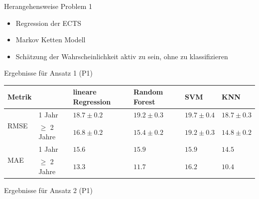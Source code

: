 \documentclass[17pt, fleqn]{beamer}
\begin{document}
\begin{frame}{Herangehensweise Problem 1}
    \begin{itemize}
        \item Regression der ECTS \\[1cm]
        \pause
        \item Markov Ketten Modell \\[1cm]
        \pause
        \item Schätzung der Wahrscheinlichkeit aktiv zu sein, ohne zu klassifizieren
    \end{itemize}
    
\end{frame}

\begin{frame}{Ergebnisse für Ansatz 1 (P1)}
    \pause
    \scriptsize{
    \begin{table}[ht]
        \begin{tabular}{ p{1cm} p{1cm} p{1.5cm} p{1.5cm} p{1.5cm} p{1.5cm} }
          Metrik &               & lineare Regression & Random Forest  & SVM            & KNN \\
          \hline
          \multirow{2}{3em}{RMSE}
                 & 1 Jahr        & $18.7 \pm 0.2$     & $19.2 \pm 0.3$ & $19.7 \pm 0.4$ & $18.7 \pm 0.3$       \\
                 & $\geq$ 2 Jahre & $16.8 \pm 0.2$     & $15.4 \pm 0.2$ & $19.2 \pm 0.3$ & $14.8 \pm 0.2$        \\
      
          \hline
          \multirow{2}{3em}{MAE}
                 & 1 Jahr        & $15.6$             & $15.9$         & $15.9$         & $14.5$        \\
                 & $\geq$ 2 Jahre & $13.3$             & $11.7$         & $16.2$         & $10.4$        \\
      
          \hline
        \end{tabular}
      \end{table}
    }
    
\end{frame}

\begin{frame}{Ergebnisse für Ansatz 2 (P1)}
    \pause    
    \begin{scriptsize}
	\end{scriptsize}
\end{frame}
\end{document}
